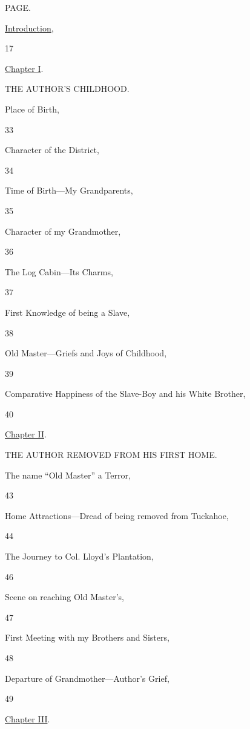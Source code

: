 {}

{}

{}

{}

{}

{}

{}

PAGE.

\href{/wiki/My_Bondage_and_My_Freedom_(1855)/Introduction}{Introduction},

17

\href{/wiki/My_Bondage_and_My_Freedom_(1855)/Chapter_I}{Chapter I}.

THE AUTHOR'S CHILDHOOD.

Place of Birth,

33

Character of the District,

34

Time of Birth---My Grandparents,

35

Character of my Grandmother,

36

The Log Cabin---Its Charms,

37

First Knowledge of being a Slave,

38

Old Master---Griefs and Joys of Childhood,

39

Comparative Happiness of the Slave-Boy and his White Brother,

40

\href{/wiki/My_Bondage_and_My_Freedom_(1855)/Chapter_II}{Chapter II}.

THE AUTHOR REMOVED FROM HIS FIRST HOME.

The name ``Old Master'' a Terror,

43

Home Attractions---Dread of being removed from Tuckahoe,

44

The Journey to Col. Lloyd's Plantation,

46

Scene on reaching Old Master's,

47

First Meeting with my Brothers and Sisters,

48

Departure of Grandmother---Author's Grief,

49

\href{/wiki/My_Bondage_and_My_Freedom_(1855)/Chapter_III}{Chapter III}.

